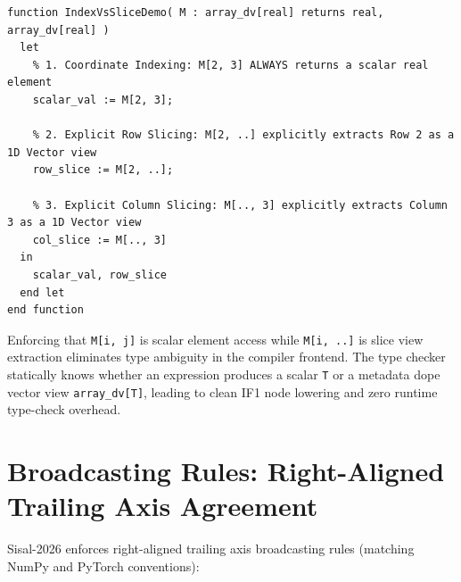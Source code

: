 \begin{lstlisting}[caption={Indexing vs. Explicit Slicing in Sisal-2026}]
function IndexVsSliceDemo( M : array_dv[real] returns real, array_dv[real] )
  let
    % 1. Coordinate Indexing: M[2, 3] ALWAYS returns a scalar real element
    scalar_val := M[2, 3];
    
    % 2. Explicit Row Slicing: M[2, ..] explicitly extracts Row 2 as a 1D Vector view
    row_slice := M[2, ..];
    
    % 3. Explicit Column Slicing: M[.., 3] explicitly extracts Column 3 as a 1D Vector view
    col_slice := M[.., 3]
  in
    scalar_val, row_slice
  end let
end function
\end{lstlisting}

\begin{tip}
Enforcing that \texttt{M[i, j]} is scalar element access while \texttt{M[i, ..]} is slice view extraction eliminates type ambiguity in the compiler frontend. The type checker statically knows whether an expression produces a scalar \texttt{T} or a metadata dope vector view \texttt{array\_dv[T]}, leading to clean IF1 node lowering and zero runtime type-check overhead.
\end{tip}

\section{Broadcasting Rules: Right-Aligned Trailing Axis Agreement}
Sisal-2026 enforces right-aligned trailing axis broadcasting rules (matching NumPy and PyTorch conventions):

